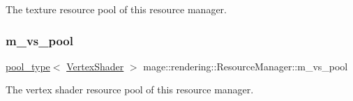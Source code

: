 The texture resource pool of this resource manager. \hypertarget{classmage_1_1rendering_1_1_resource_manager_ac4af09e51fbbcfb534edb72d98033979}{}\label{classmage_1_1rendering_1_1_resource_manager_ac4af09e51fbbcfb534edb72d98033979} 
\subsubsection{\texorpdfstring{m\+\_\+vs\+\_\+pool}{m\_vs\_pool}}
{\footnotesize\ttfamily \hyperlink{classmage_1_1rendering_1_1_resource_manager_ab21a4e280087032ee533f267bd9bf602}{pool\+\_\+type}$<$ \hyperlink{classmage_1_1rendering_1_1_vertex_shader}{Vertex\+Shader} $>$ mage\+::rendering\+::\+Resource\+Manager\+::m\+\_\+vs\+\_\+pool\hspace{0.3cm}{\ttfamily [private]}}

The vertex shader resource pool of this resource manager. 